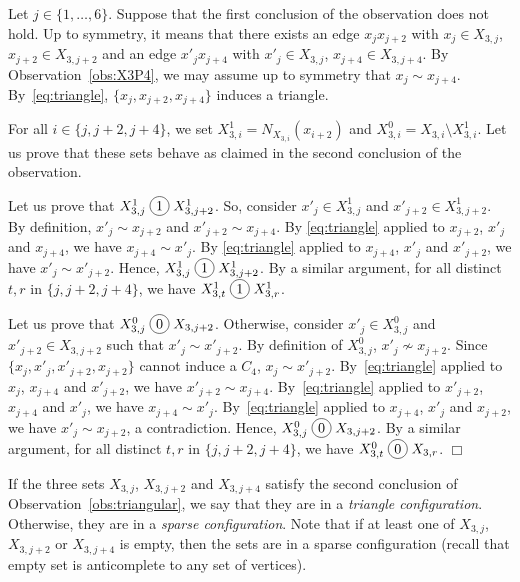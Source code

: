\documentclass[12pt]{article}
\newcommand*\circled[1]{\tikz[baseline=(char.base)]{
		\node[shape=circle,draw,inner sep=2pt] (char) {#1};}}
\newcommand{\join}{\; \circled{1} \;}
\newcommand{\cojoin}{\; \circled{0} \;}
\newcommand{\qed}{\hfill $\Box$}
\begin{document}
Let $j\in \{1, \dots, 6\}$.  Suppose that the first conclusion of the observation does not hold. Up to symmetry, it means that there exists an edge $x_j x_{j+2}$ with $x_j\in X_{3, j}$, $x_{j+2}\in X_{3, j+2}$ and an edge $x'_j x_{j+4}$  with $x'_j\in X_{3, j}$, $x_{j+4}\in X_{3, j+4}$. 
By Observation~\ref{obs:X3P4},  we may assume up to symmetry that $x_j\sim x_{j+4}$. By~\eqref{eq:triangle}, $\{x_j, x_{j+2}, x_{j+4}\}$ induces a triangle. 

For all $i \in \{j, j+2, j+4\}$, we set $X_{3,i}^{1} = N_{X_{3, i}}(x_{i+2})$ and $X_{3,i}^{0} =   X_{3,i}  \setminus X_{3,i}^{1}$.  Let us prove that these sets behave as claimed in the second conclusion of the observation. 

Let us prove that $X_{3,j}^1 \join X_{3,j+2}^1$. So, consider $x'_j \in X_{3,j}^1$ and $x'_{j+2} \in X_{3,j+2}^1$.  By definition, $x'_j \sim x_{j+2}$ and $x'_{j+2}\sim x_{j+4}$.  By \eqref{eq:triangle} applied to $x_{j+2}$, $x'_j$ and $x_{j+4}$, we have  $x_{j+4} \sim x'_j$.  By \eqref{eq:triangle} applied to $x_{j+4}$, $x'_j$ and $x'_{j+2}$, we have $x'_{j} \sim x'_{j+2}$.  Hence, $X_{3,j}^1 \join X_{3,j+2}^1$.  By a similar argument, for all distinct $t,r$ in $\{j, j+2, j+4\}$, we have  $X_{3,t}^1 \join X_{3,r}^1$. 

Let us prove that $X_{3,j}^0 \cojoin X_{3,j+2}$. Otherwise,  consider $x'_j \in X_{3,j}^0$ and $x'_{j+2} \in X_{3,j+2}$ such that $x'_j \sim x'_{j+2}$.  By definition of $X_{3,j}^0$, $x'_j \not\sim x_{j+2}$.  Since $\{x_j, x'_j, x'_{j+2}, x_{j+2}\}$ cannot induce a $C_4$, $x_j \sim x'_{j+2}$. By~\eqref{eq:triangle} applied to $x_{j}$, $x_{j+4}$ and $x'_{j+2}$, we have $x'_{j+2} \sim x_{j+4}$.  By~\eqref{eq:triangle} applied to $x'_{j+2}$, $x_{j+4}$ and $x'_{j}$, we have  $x_{j+4} \sim x'_{j}$.  By~\eqref{eq:triangle} applied to $x_{j+4}$, $x'_{j}$ and $x_{j+2}$, we have  $x'_{j} \sim x_{j+2}$, a contradiction.  Hence, $X_{3,j}^0 \cojoin X_{3,j+2}$.  By a similar argument, for all distinct $t,r$ in $\{j, j+2, j+4\}$, we have  $X_{3,t}^0 \cojoin X_{3,r}$. \qed

\medskip

If the three sets $X_{3,j}$, $X_{3,j+2}$ and $X_{3,j+4}$  satisfy the second conclusion of Observation~\ref{obs:triangular}, we say that they are in a {\it triangle configuration}.  Otherwise, they are in a \emph{sparse configuration}. Note that if at least one of $X_{3, j}$, $X_{3, j+2}$ or $X_{3, j+4}$ is empty, then the sets are in a sparse configuration (recall that empty set is anticomplete to any set of vertices).
\end{document}
